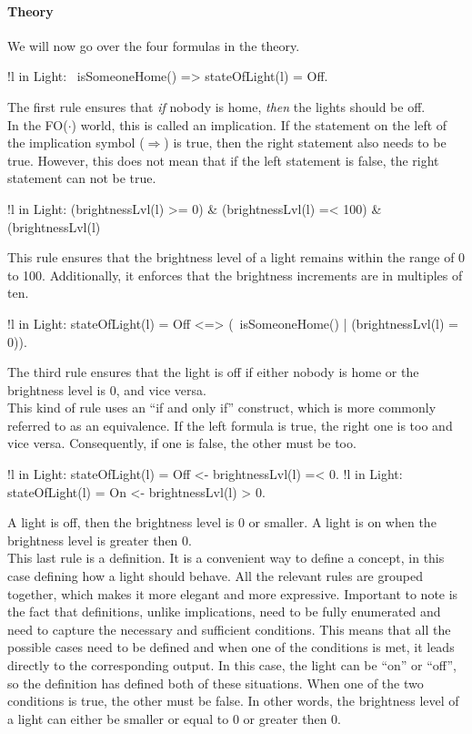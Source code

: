 \documentclass[11pt,a4paper]{report}
\newcommand{\fodot}{FO($\cdot$)\xspace}
\begin{document}
\paragraph{Theory}
We will now go over the four formulas in the theory.
\begin{idplisting}
!l in Light: ~isSomeoneHome() => stateOfLight(l) = Off.
\end{idplisting}
The first rule ensures that \textit{if} nobody is home, \textit{then} the lights should be off.\\
In the \fodot world, this is called an implication. If the statement on the left of the implication symbol ($\Rightarrow$) is true, then the right statement also needs to be true. However, this does not mean that if the left statement is false, the right statement can not be true.
\begin{idplisting}
!l in Light: (brightnessLvl(l) >= 0) & (brightnessLvl(l) =< 100) & (brightnessLvl(l) %
\end{idplisting}
This rule ensures that the brightness level of a light remains within the range of 0 to 100. Additionally, it enforces that the brightness increments are in multiples of ten.
\begin{idplisting}
!l in Light: stateOfLight(l) = Off <=> (~isSomeoneHome() | (brightnessLvl(l) = 0)).
\end{idplisting}
The third rule ensures that the light is off if either nobody is home or the brightness level is 0, and vice versa.\\
This kind of rule uses an ``if and only if'' construct, which is more commonly referred to as an equivalence. If the left formula is true, the right one is too and vice versa. Consequently, if one is false, the other must be too.

\begin{idplisting}
{
   !l in Light: stateOfLight(l) = Off <- brightnessLvl(l) =< 0.
   !l in Light: stateOfLight(l) = On <- brightnessLvl(l) > 0.
}
\end{idplisting}
A light is off, then the brightness level is 0 or smaller. A light is on when the brightness level is greater then 0.\\
This last rule is a definition. It is a convenient way to define a concept, in this case defining how a light should behave. All the relevant rules are grouped together, which makes it more elegant and more expressive. Important to note is the fact that definitions, unlike implications, need to be fully enumerated and need to capture the necessary and sufficient conditions. This means that all the possible cases need to be defined and when one of the conditions is met, it leads directly to the corresponding output.
In this case, the light can be ``on'' or ``off'', so the definition has defined both of these situations. When one of the two conditions is true, the other must be false. In other words, the brightness level of a light can either be smaller or equal to 0 or greater then 0.
\end{document}
